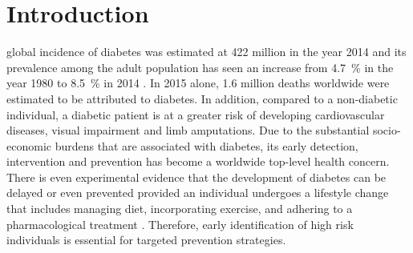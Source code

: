 \documentclass[journal,comsoc]{IEEEtran}
\renewcommand{\^}{\hat}  %
\begin{document}
\section{Introduction}
%
%
%
%
 global incidence of diabetes was estimated at \num{422} million in the year \num{2014} and its prevalence among the adult population has seen an increase from \SI{4.7}{\percent} in the year \num{1980} to \SI{8.5}{\percent} in \num{2014} \cite{mathers_projections_2006}. In \num{2015} alone, \num{1.6} million deaths worldwide were estimated to be attributed to diabetes. In addition, compared to a non-diabetic individual, a diabetic patient is at a greater risk of developing cardiovascular diseases, visual impairment and limb amputations. Due to the substantial socio-economic burdens that are associated with diabetes, its early detection, intervention and prevention has become a worldwide top-level health concern. There is even experimental evidence that the development of diabetes can be delayed or even prevented provided an individual undergoes a lifestyle change that includes managing diet, incorporating exercise, and adhering to a pharmacological treatment \cite{tuomilehto2001prevention}. Therefore, early identification of high risk individuals is essential for targeted prevention strategies.\\
\end{document}
